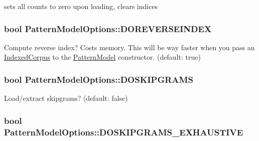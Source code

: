 sets all counts to zero upon loading, clears indices 

\hypertarget{classPatternModelOptions_ad4d4b2fa96e3355b9e3f4b8e51bb62ff}{}
\subsubsection[{D\+O\+R\+E\+V\+E\+R\+S\+E\+I\+N\+D\+E\+X}]{\setlength{\rightskip}{0pt plus 5cm}bool Pattern\+Model\+Options\+::\+D\+O\+R\+E\+V\+E\+R\+S\+E\+I\+N\+D\+E\+X}\label{classPatternModelOptions_ad4d4b2fa96e3355b9e3f4b8e51bb62ff}


Compute reverse index? Costs memory. This will be way faster when you pass an \hyperlink{classIndexedCorpus}{Indexed\+Corpus} to the \hyperlink{classPatternModel}{Pattern\+Model} constructor. (default\+: true) 

\hypertarget{classPatternModelOptions_a79465fd9abbfab5a481222d9660e598a}{}
\subsubsection[{D\+O\+S\+K\+I\+P\+G\+R\+A\+M\+S}]{\setlength{\rightskip}{0pt plus 5cm}bool Pattern\+Model\+Options\+::\+D\+O\+S\+K\+I\+P\+G\+R\+A\+M\+S}\label{classPatternModelOptions_a79465fd9abbfab5a481222d9660e598a}


Load/extract skipgrams? (default\+: false) 

\hypertarget{classPatternModelOptions_ab9f8da4d9fe653cf967f571ae6766ed4}{}
\subsubsection[{D\+O\+S\+K\+I\+P\+G\+R\+A\+M\+S\+\_\+\+E\+X\+H\+A\+U\+S\+T\+I\+V\+E}]{\setlength{\rightskip}{0pt plus 5cm}bool Pattern\+Model\+Options\+::\+D\+O\+S\+K\+I\+P\+G\+R\+A\+M\+S\+\_\+\+E\+X\+H\+A\+U\+S\+T\+I\+V\+E}\label{classPatternModelOptions_ab9f8da4d9fe653cf967f571ae6766ed4}


